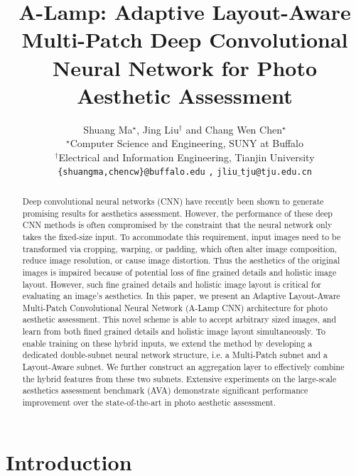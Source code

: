 \documentclass[10pt,twocolumn,letterpaper]{article}
\begin{document}
	
\title{A-Lamp: Adaptive Layout-Aware Multi-Patch Deep Convolutional Neural Network for Photo Aesthetic Assessment}
	
		
	\author{Shuang Ma{$^\star$},
Jing Liu{$^\dagger$} and
		Chang Wen Chen{$^\star$}\\
		{$^\star$}Computer Science and Engineering, SUNY at Buffalo\\ {$^\dagger$}Electrical and Information Engineering, Tianjin University\\
		{\tt\small \{shuangma,chencw\}@buffalo.edu} {\tt\small,} {\tt\small jliu$\_$tju@tju.edu.cn}
	}
\maketitle
\begin{abstract}			
		Deep convolutional neural networks (CNN) have recently been shown to generate promising results for aesthetics assessment. However, the performance of these deep CNN methods is often compromised by the constraint that the neural network only takes the fixed-size input. To accommodate this requirement, input images need to be transformed via cropping, warping, or padding, which often alter image composition, reduce image resolution, or cause image distortion. Thus the aesthetics of the original images is impaired because of potential loss of fine grained details and holistic image layout. However, such fine grained details and holistic image layout is critical for evaluating an image's aesthetics. 
		In this paper, we present an Adaptive Layout-Aware Multi-Patch Convolutional Neural Network (A-Lamp CNN) architecture for photo aesthetic assessment. This novel scheme is able to accept arbitrary sized images, and learn from both fined grained details and holistic image layout simultaneously. To enable training on these hybrid inputs, we extend the method by developing a dedicated double-subnet neural network structure, i.e. a Multi-Patch subnet and a Layout-Aware subnet. We further construct an aggregation layer to effectively combine the hybrid features from these two subnets. Extensive experiments on the large-scale aesthetics assessment benchmark (AVA) demonstrate significant performance improvement over the state-of-the-art in photo aesthetic assessment.
		
	\end{abstract}
	
\section{Introduction} \label{intro}
	
\end{document}
